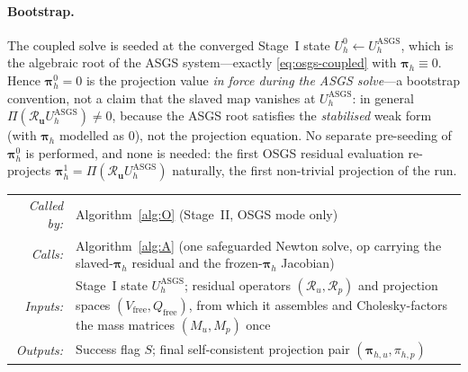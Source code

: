 \documentclass{article}
\makeatletter
\newcommand{\moduleinterface}[4]{%
\begin{interfacecard}
\footnotesize
\begin{tabular}{@{}r@{\quad}p{0.82\textwidth}@{}}
\textit{Called by:} & #1 \\
\textit{Calls:}     & #2 \\
\textit{Inputs:}    & #3 \\
\textit{Outputs:}   & #4 \\
\end{tabular}
\end{interfacecard}
}
\makeatother
\begin{document}
\paragraph{Bootstrap.}  The coupled solve is seeded at the converged
Stage~I state $U_h^0 \gets U_h^{\mathrm{ASGS}}$, which is the algebraic
root of the ASGS system---exactly \eqref{eq:osgs-coupled} with
$\boldsymbol{\pi}_h \equiv 0$. Hence $\boldsymbol{\pi}_h^0 = 0$ is the
projection value \emph{in force during the ASGS solve}---a bootstrap
convention, not a claim that the slaved map vanishes at $U_h^{\mathrm{ASGS}}$:
in general $\Pi(\mathcal{R}_{\boldsymbol{u}}U_h^{\mathrm{ASGS}}) \neq 0$,
because the ASGS root satisfies the \emph{stabilised} weak form (with
$\boldsymbol{\pi}_h$ modelled as $0$), not the projection equation. No
separate pre-seeding of $\boldsymbol{\pi}_h^0$ is performed, and none is
needed: the first OSGS residual evaluation re-projects
$\boldsymbol{\pi}_h^1 = \Pi(\mathcal{R}_{\boldsymbol{u}}U_h^{\mathrm{ASGS}})$
naturally, the first non-trivial projection of the run.

\moduleinterface
    {Algorithm~\ref{alg:O} (Stage~II, OSGS mode only)}
    {Algorithm~\ref{alg:A} (one safeguarded Newton solve, $\mathrm{op}$ carrying the slaved-$\boldsymbol{\pi}_h$ residual and the frozen-$\boldsymbol{\pi}_h$ Jacobian)}
    {Stage~I state $U_h^{\mathrm{ASGS}}$; residual operators $(\mathcal{R}_u, \mathcal{R}_p)$ and projection spaces $(V_{\mathrm{free}}, Q_{\mathrm{free}})$, from which it assembles and Cholesky-factors the mass matrices $(M_u, M_p)$ once}
    {Success flag $S$; final self-consistent projection pair $(\boldsymbol{\pi}_{h,u}, \pi_{h,p})$}
\end{document}
